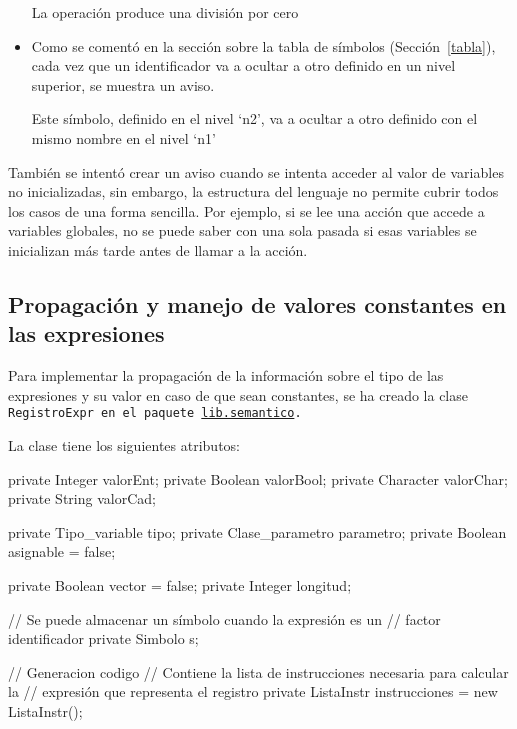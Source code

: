 \begin{itemize}
    \begin{codigo}
    La operación produce una división por cero
    \end{codigo}

    \item Como se comentó en la sección sobre la tabla de símbolos (Sección~\ref{tabla}), cada vez que un identificador va a ocultar a otro definido en un nivel superior, se muestra un aviso.

    \begin{codigo}
    Este símbolo, definido en el nivel `n2', va a ocultar a otro definido con el mismo nombre en el nivel `n1'
    \end{codigo}

\end{itemize}

También se intentó crear un aviso cuando se intenta acceder al valor de variables no inicializadas, sin embargo, la estructura del lenguaje no permite cubrir todos los casos de una forma sencilla. Por ejemplo, si se lee una acción que accede a variables globales, no se puede saber con una sola pasada si esas variables se inicializan más tarde antes de llamar a la acción.

\subsection{Propagación y manejo de valores constantes en las expresiones}
Para implementar la propagación de la información sobre el tipo de las expresiones y su valor en caso de que sean constantes, se ha creado la clase \tt{RegistroExpr} en el paquete \url{lib.semantico}.

La clase tiene los siguientes atributos:

\begin{codigo}[style=java]
private Integer valorEnt;
private Boolean valorBool;
private Character valorChar;
private String valorCad;

private Tipo_variable tipo;
private Clase_parametro parametro;
private Boolean asignable = false;

private Boolean vector = false;
private Integer longitud;

// Se puede almacenar un símbolo cuando la expresión es un
// factor identificador
private Simbolo s;

// Generacion codigo
// Contiene la lista de instrucciones necesaria para calcular la
// expresión que representa el registro
private ListaInstr instrucciones = new ListaInstr();
\end{codigo}

